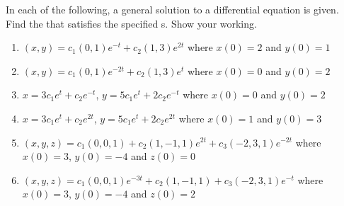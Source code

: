 \begin{exercise} \label{ex:} 
In each of the following, a general solution to a differential equation is given.  
Find the  that satisfies the specified s.
Show your working.
\begin{enumerate}
\item \((x,y)=c_1(0,1)e^{-t}+c_2(1,3)e^{2t}\) where \(x(0)=2\) and \(y(0)=1\)

\item \((x,y)=c_1(0,1)e^{-2t}+c_2(1,3)e^{t}\) where \(x(0)=0\) and \(y(0)=2\)

\item \(x=3c_1e^t+c_2e^{-t}\), \(y=5c_1e^t+2c_2e^{-t}\) where \(x(0)=0\) and \(y(0)=2\)

\item \(x=3c_1e^t+c_2e^{2t}\), \(y=5c_1e^t+2c_2e^{2t}\) where \(x(0)=1\) and \(y(0)=3\)

\item \((x,y,z)=c_1(0,0,1) +c_2(1,-1,1)e^{2t} +c_3(-2,3,1)e^{-2t}\) where \(x(0)=3\), \(y(0)=-4\) and \(z(0)=0\)

\item \((x,y,z)=c_1(0,0,1)e^{-3t} +c_2(1,-1,1) +c_3(-2,3,1)e^{-t}\) where \(x(0)=3\), \(y(0)=-4\) and \(z(0)=2\)

\end{enumerate}
\end{exercise}







